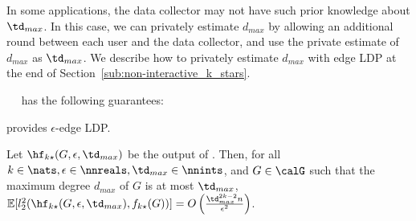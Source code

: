 In some applications, the data collector may not have such prior knowledge about $\td_{max}$. 
In this case, we can 
privately estimate $d_{max}$ by allowing an additional round between each user and the data collector, and use the private estimate of $d_{max}$ as $\td_{max}$. 
We describe how to privately estimate $d_{max}$ with edge LDP at the end of Section~\ref{sub:non-interactive_k_stars}. 



\smallskip
{}~~ 
has the following guarantees:

\begin{theorem}\label{thm:k-stars_LDP}
  provides $\epsilon$-edge LDP.
\end{theorem}

\begin{theorem}\label{thm:k-stars}
  Let
  $\hf_{k\star}(G, \epsilon, \td_{max})$ 
  be the output of 
  . 
  Then, 
  for all 
  $k \in \nats,\epsilon \in \nnreals,\td_{max} \in \nnints$, 
  and $G \in \calG$
  such that the maximum degree $d_{max}$ of $G$ 
  is at most 
  $\td_{max}$, 
  $\mathbb{E}[l_2^2(\hf_{k\star}(G, \epsilon, \td_{max}), f_{k\star}(G))] = 
  O\left( \frac{\td_{max}^{2k-2}n}{\epsilon^2} \right)$. 
\end{theorem}

